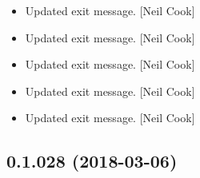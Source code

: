 \documentclass[a4paper,10pt,english]{report}
\begin{document}
\begin{itemize}
\item {} 
Updated exit message. {[}Neil Cook{]}

\item {} 
Updated exit message. {[}Neil Cook{]}

\item {} 
Updated exit message. {[}Neil Cook{]}

\item {} 
Updated exit message. {[}Neil Cook{]}

\item {} 
Updated exit message. {[}Neil Cook{]}

\end{itemize}


\subsection{0.1.028 (2018-03-06)}
\end{document}
